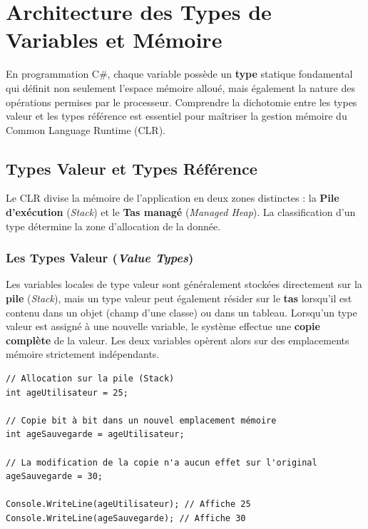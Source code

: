 
\newpage
\section{Architecture des Types de Variables et Mémoire}

En programmation C\#, chaque variable possède un \textbf{type} statique fondamental qui définit non seulement l'espace mémoire alloué, mais également la nature des opérations permises par le processeur. Comprendre la dichotomie entre les types valeur et les types référence est essentiel pour maîtriser la gestion mémoire du Common Language Runtime (CLR).

\subsection{Types Valeur et Types Référence}

Le CLR divise la mémoire de l'application en deux zones distinctes : la \textbf{Pile d'exécution} (\emph{Stack}) et le \textbf{Tas managé} (\emph{Managed Heap}). La classification d'un type détermine la zone d'allocation de la donnée.

\subsubsection{Les Types Valeur (\emph{Value Types})}
Les variables locales de type valeur sont généralement stockées directement sur la \textbf{pile} (\emph{Stack}), mais un type valeur peut également résider sur le \textbf{tas} lorsqu'il est contenu dans un objet (champ d'une classe) ou dans un tableau.
Lorsqu'un type valeur est assigné à une nouvelle variable, le système effectue une \textbf{copie complète} de la valeur. Les deux variables opèrent alors sur des emplacements mémoire strictement indépendants.

\begin{lstlisting}[caption={Comportement en mémoire des types valeur (pile)}]
// Allocation sur la pile (Stack)
int ageUtilisateur = 25; 

// Copie bit à bit dans un nouvel emplacement mémoire
int ageSauvegarde = ageUtilisateur; 

// La modification de la copie n'a aucun effet sur l'original
ageSauvegarde = 30; 

Console.WriteLine(ageUtilisateur); // Affiche 25
Console.WriteLine(ageSauvegarde); // Affiche 30
\end{lstlisting}

